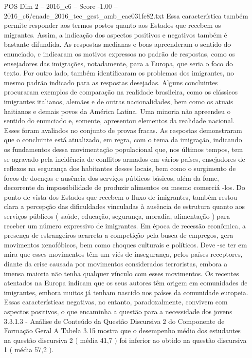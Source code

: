 \begin{textsample}{POS Dim 2 – 2016\_c6 – Score -1.00 – 2016\_c6/enade\_2016\_tec\_gest\_amb\_eac031fe82.txt}
Essa característica também permite responder aos termos postos quanto aos Estados que recebem os migrantes.
Assim, a indicação dos aspectos positivos e negativos também é bastante difundida.
As respostas medianas e boas apreenderam o sentido do enunciado, e indicaram os motivos expressos no padrão de respostas, como os ensejadores das imigrações, notadamente, para a Europa, que seria o foco do texto.
Por outro lado, também identificaram os problemas dos imigrantes, no mesmo padrão indicado para as respostas desejadas.
Alguns concluintes procuraram exemplos de comparação na realidade brasileira, como os clássicos imigrantes italianos, alemães e de outras nacionalidades, bem como os atuais haitianos e demais povos da América Latina.
Uma minoria não apreendeu o sentido do enunciado e, somente, apresentou elementos da realidade nacional.
Esses foram avaliados no conjunto de provas fracas.
As respostas demonstraram que o concluinte está atualizado, em regra, com o tema da imigração, indicando os fundamentos dessa movimentação populacional que, nos últimos tempos, tem se agravado pela incidência de conflitos armados em vários países, ensejadores de reflexos na segurança dos habitantes desses locais, bem como o surgimento de focos de doenças e ausência dos serviços públicos básicos, além da fome, decorrente da impossibilidade de produzir alimentos ou mesmo comerciá -los.
Do ponto de vista dos Estados que recebem o fluxo de imigrantes, também restou clara a percepção das dificuldades vinculadas à ausência de estrutura quanto aos serviços públicos ( saúde, educação, segurança, moradia, alimentação ) para receber um número expressivo de imigrantes.
Em época de recessão econômica, a presença de estrangeiros acarreta a competição pela busca de empregos, gera movimentos xenofóbicos, bem como choques culturais e políticos.
Deve -se ter em mira que esses movimentos têm um viés de insegurança, pelos países receptores, diante da crise causada por movimentos considerados terroristas, embora a imensa maioria não tenha qualquer vínculo com esses movimentos.
Os recentes atentados na Europa indicam que os seus autores têm origem em comunidades de imigrantes, embora muitos já tenham nascido nos países da comunidade europeia.
Essas características negativas, no entanto, paradoxalmente, convivem com aspectos positivos, o que encaminha a questão para a necessidade dos jovens 3.3.1.3 - Análise de Conteúdo da Questão Discursiva 2 do Componente de Formação Geral A Tabela 3.15 mostra que o desempenho médio dos estudantes na questão discursiva 2 ( média 41,7 ) foi inferior ao obtido na questão discursiva 1 ( média 57,2 ).

\end{textsample}
